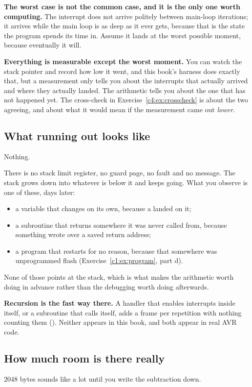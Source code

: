 \textbf{The worst case is not the common case, and it is the only one worth computing.} The
interrupt does not arrive politely between main-loop iterations; it arrives while the main loop is
as deep as it ever gets, because that is the state the program spends its time in. Assume it lands
at the worst possible moment, because eventually it will.

\textbf{Everything is measurable except the worst moment.} You can watch the stack pointer and
record how low it went, and this book's harness does exactly that, but a measurement only tells
you about the interrupts that actually arrived and where they actually landed. The arithmetic tells
you about the one that has not happened yet. The cross-check in Exercise~\ref{c4:ex:crosscheck} is
about the two agreeing, and about what it would mean if the measurement came out \emph{lower}.

\subsection{What running out looks like}
\label{c4:sec:overflow}
Nothing.

There is no stack limit register, no guard page, no fault and no message. The stack grows down into
whatever is below it and keeps going. What you observe is one of these, days later:
\begin{itemize}
  \item a variable that changes on its own, because a  landed on it;
  \item a subroutine that returns somewhere it was never called from, because something wrote over
    a saved return address;
  \item a program that restarts for no reason, because that somewhere was unprogrammed flash
    (Exercise~\ref{c1:ex:program}, part d).
\end{itemize}

None of those points at the stack, which is what makes the arithmetic worth doing in advance rather
than the debugging worth doing afterwards.

\textbf{Recursion is the fast way there.} A handler that enables interrupts inside itself, or a
subroutine that calls itself, adds a frame per repetition with nothing counting them
(). Neither appears in this book, and both appear in real AVR code.

\subsection{How much room is there really}
\label{c4:sec:room}
2048 bytes sounds like a lot until you write the subtraction down.


